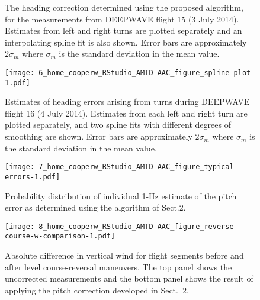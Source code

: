 \documentclass[english,british,amtd,bookmarks=false,unicode=true]{copernicus}\usepackage[]{graphicx}\usepackage[]{color}
\begin{document}
\begin{center}
\begin{figure}
\caption{The heading correction determined using the proposed algorithm, for the measurements from DEEPWAVE flight 15 (3 July 2014). Estimates from left and right turns are plotted separately and an interpolating spline fit is also shown. Error bars are approximately $2\sigma_m$ where $\sigma_m$ is the standard deviation in the mean value.\label{fig:plot-heading-correction-rf15}}
\end{figure}
\begin{figure}
\begin{centering}
\texttt{[image: 6\_home\_cooperw\_RStudio\_AMTD-AAC\_figure\_spline-plot-1.pdf]}
\par\end{centering}

\caption{Estimates of heading errors arising from turns during DEEPWAVE flight 16 (4 July 2014). Estimates from each left and right turn are plotted separately, and two spline fits with different degrees of smoothing are shown. Error bars are approximately $2\sigma_m$ where $\sigma_m$ is the standard deviation in the mean value.\label{fig:spline-plot}}
\end{figure}
\begin{figure}
\begin{centering}
\texttt{[image: 7\_home\_cooperw\_RStudio\_AMTD-AAC\_figure\_typical-errors-1.pdf]}
\par\end{centering}

\caption{Probability distribution of individual 1-Hz estimate of the pitch error as determined using the algorithm of Sect.2.\label{fig:typical-errors}}
\end{figure}
\begin{figure}
\begin{centering}
\texttt{[image: 8\_home\_cooperw\_RStudio\_AMTD-AAC\_figure\_reverse-course-w-comparison-1.pdf]}
\par\end{centering}

\caption{Absolute difference in vertical wind for flight segments before and after level course-reversal maneuvers. The top panel shows the uncorrected measurements and the bottom panel shows the result of applying the pitch correction developed in Sect.\ 2.\label{fig:reverse-course-w-comparison}}
\end{figure}

\par\end{center}
\end{document}
